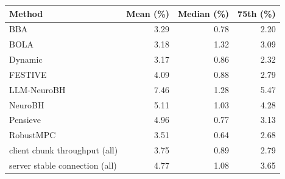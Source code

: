 \begin{tabular}{lrrr}
\toprule
Method & Mean (\%) & Median (\%) & 75th (\%)\\
\midrule
BBA & 3.29 & 0.78 & 2.20\\
BOLA & 3.18 & 1.32 & 3.09\\
Dynamic & 3.17 & 0.86 & 2.32\\
FESTIVE & 4.09 & 0.88 & 2.79\\
LLM-NeuroBH & 7.46 & 1.28 & 5.47\\
NeuroBH & 5.11 & 1.03 & 4.28\\
Pensieve & 4.96 & 0.77 & 3.13\\
RobustMPC & 3.51 & 0.64 & 2.68\\
client chunk throughput (all) & 3.75 & 0.89 & 2.79\\
server stable connection (all) & 4.77 & 1.08 & 3.65\\
\bottomrule
\end{tabular}
